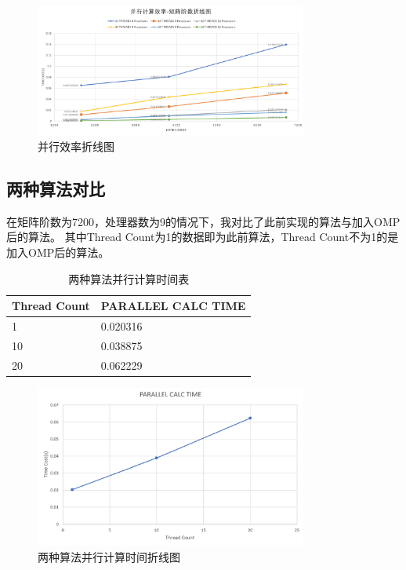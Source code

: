 \documentclass[UTF8]{article}
\begin{document}
    \begin{figure}[h]
        \label{Ratio}
        \centering
            \includegraphics[width=0.8\textwidth]{eff.png}
            \caption{并行效率折线图}
        \end{figure}
        \clearpage

\subsection{两种算法对比}
在矩阵阶数为7200，处理器数为9的情况下，我对比了此前实现的算法与加入OMP后的算法。
其中Thread Count为1的数据即为此前算法，Thread Count不为1的是加入OMP后的算法。
\begin{table}[h]
    \caption{两种算法并行计算时间表}
    \label{tab:my-table}
    \centering

    \begin{tabular}{|l|l|}
    \hline
    Thread Count & PARALLEL CALC TIME \\ \hline
    1            & 0.020316           \\ \hline
    10           & 0.038875           \\ \hline
    20           & 0.062229           \\ \hline
    \end{tabular}
    \end{table}
    \begin{figure}[h]
        \label{Ratio}
        \centering
            \includegraphics[width=0.8\textwidth]{cmpc.png}
            \caption{两种算法并行计算时间折线图}
        \end{figure}
\end{document}
